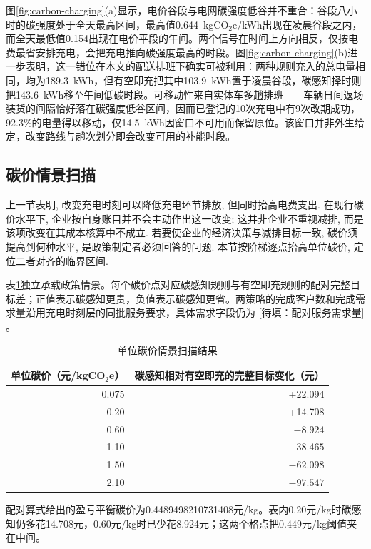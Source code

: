 \documentclass{setp-new}
\DeclareRobustCommand{\TBD}[1]{%
  \begingroup\setlength{\fboxsep}{1.2pt}%
  \colorbox{black!12}{\textcolor{black!65}{\textsf{\footnotesize[待填：#1]}}}%
  \endgroup}
\begin{document}
图\ref{fig:carbon-charging}(a)显示，电价谷段与电网碳强度低谷并不重合：谷段八小时的碳强度处于全天最高区间，最高值0.644~kgCO$_2$e/kWh出现在凌晨谷段之内，而全天最低值0.154出现在电价平段的午间。两个信号在时间上方向相反，仅按电费最省安排充电，会把充电推向碳强度最高的时段。图\ref{fig:carbon-charging}(b)进一步表明，这一错位在本文的配送排班下确实可被利用：两种规则充入的总电量相同，均为189.3~kWh，但有空即充把其中103.9~kWh置于凌晨谷段，碳感知择时则把143.6~kWh移至午间低碳时段。可移动性来自实体车多趟排班——车辆日间返场装货的间隔恰好落在碳强度低谷区间，因而已登记的10次充电中有9次改期成功，92.3\%的电量得以移动，仅14.5~kWh因窗口不可用而保留原位。该窗口并非外生给定，改变路线与趟次划分即会改变可用的补能时段。

\subsection{碳价情景扫描}

上一节表明, 改变充电时刻可以降低充电环节排放, 但同时抬高电费支出.
在现行碳价水平下, 企业按自身账目并不会主动作出这一改变;
这并非企业不重视减排, 而是该项改变在其成本核算中不成立.
若要使企业的经济决策与减排目标一致, 碳价须提高到何种水平, 是政策制定者必须回答的问题.
本节按阶梯逐点抬高单位碳价, 定位二者对齐的临界区间.

表\ref{tab:carbon-price}独立承载政策情景。每个碳价点对应碳感知规则与有空即充规则的配对完整目标差；正值表示碳感知更贵，负值表示碳感知更省。两策略的完成客户数和完成需求量沿用充电时刻层的同批服务要求，具体需求字段仍为\TBD{配对服务需求量}。

\begin{table}[htbp]
  \centering
  \caption{单位碳价情景扫描结果}
  \label{tab:carbon-price}
  \small
  \begin{tabular}{rr}
    \toprule
    单位碳价（元/kgCO$_2$e） & 碳感知相对有空即充的完整目标变化（元）\\
    \midrule
    0.075 & +22.094\\
    0.20 & +14.708\\
    0.60 & $-8.924$\\
    1.10 & $-38.465$\\
    1.50 & $-62.098$\\
    2.10 & $-97.547$\\
    \bottomrule
  \end{tabular}
\end{table}

配对算式给出的盈亏平衡碳价为0.4489498210731408元/kg。表内0.20元/kg时碳感知仍多花14.708元，0.60元/kg时已少花8.924元；这两个格点把0.449元/kg阈值夹在中间。
\end{document}
